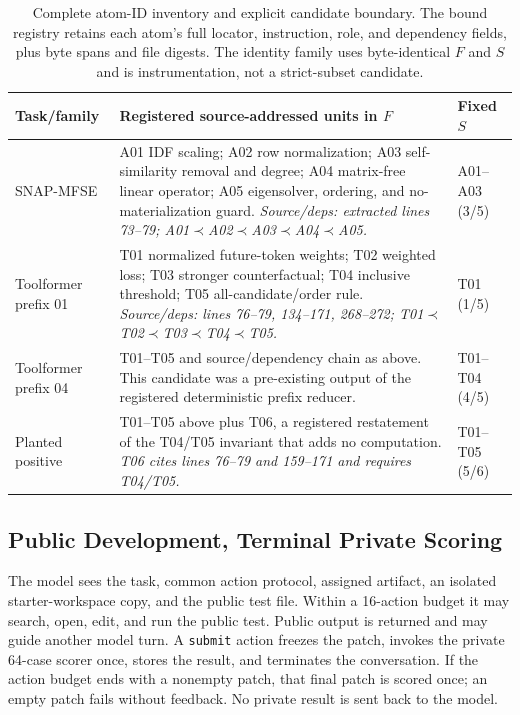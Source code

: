 \documentclass[letterpaper]{article} %
\begin{document}
\begin{table}[t]
\centering
\small
\begin{tabular}{p{}p{}p{}}
\toprule
Task/family & Registered source-addressed units in $F$ & Fixed $S$ \\
\midrule
SNAP-MFSE & A01 IDF scaling; A02 row normalization; A03 self-similarity removal
and degree; A04 matrix-free linear operator; A05 eigensolver, ordering, and
no-materialization guard.  \emph{Source/deps: extracted lines 73--79;
A01$\prec$A02$\prec$A03$\prec$A04$\prec$A05.} & A01--A03 (3/5) \\
Toolformer prefix 01 & T01 normalized future-token weights; T02 weighted loss; T03
stronger counterfactual; T04 inclusive threshold; T05 all-candidate/order rule.
\emph{Source/deps: lines 76--79, 134--171, 268--272;
T01$\prec$T02$\prec$T03$\prec$T04$\prec$T05.} & T01 (1/5) \\
Toolformer prefix 04 & T01--T05 and source/dependency chain as above.  This
candidate was a pre-existing output of the registered deterministic prefix
reducer. & T01--T04 (4/5) \\
Planted positive & T01--T05 above plus T06, a registered restatement of the
T04/T05 invariant that adds no computation.  \emph{T06 cites lines 76--79 and
159--171 and requires T04/T05.} & T01--T05 (5/6) \\
\bottomrule
\end{tabular}
\caption{Complete atom-ID inventory and explicit candidate boundary.  The bound
registry retains each atom's full locator, instruction, role, and dependency
fields, plus byte spans and file
digests.  The identity family uses
byte-identical $F$ and $S$ and is instrumentation, not a strict-subset candidate.}
\label{tab:atoms}
\end{table}

\subsection{Public Development, Terminal Private Scoring}

The model sees the task, common action protocol, assigned artifact, an isolated
starter-workspace copy, and the public test file.  Within a 16-action budget it
may search, open, edit,
and run the public test.  Public output is returned and may guide another model
turn.  A \texttt{submit} action freezes the patch, invokes the private 64-case
scorer once, stores the result, and terminates the conversation.  If the action
budget ends with a nonempty patch, that final patch is scored once; an empty patch
fails without feedback.  No private result is sent back to the model.
\end{document}
